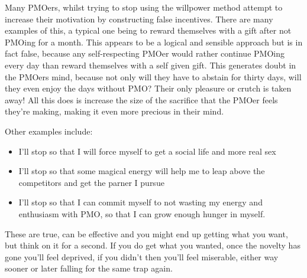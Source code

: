 \documentclass[easypeasy.tex]{subfiles}
\begin{document}
Many PMOers, whilst trying to stop using the willpower method attempt to increase their motivation by constructing false incentives. There are many examples of this, a typical one being to reward themselves with a gift after not PMOing for a month. This appears to be a logical and sensible approach but is in fact false, because any self-respecting PMOer would rather continue PMOing every day than reward themselves with a self given gift. This generates doubt in the PMOers mind, because not only will they have to abstain for thirty days, will they even enjoy the days without PMO? Their only pleasure or crutch is taken away! All this does is increase the size of the sacrifice that the PMOer feels they're making, making it even more precious in their mind.

Other examples include:
\begin{itemize}
  \item I'll stop so that I will force myself to get a social life and more real sex
  \item I'll stop so that some magical energy will help me to leap above the competitors and get the parner I pursue
  \item I'll stop so that I can commit myself to not wasting my energy and enthusiasm with PMO, so that I can grow enough hunger in myself.
\end{itemize}

These are true, can be effective and you might end up getting what you want, but think on it for a second. If you do get what you wanted, once the novelty has gone you'll feel deprived, if you didn't then you'll feel miserable, either way sooner or later falling for the same trap again.
\end{document}
